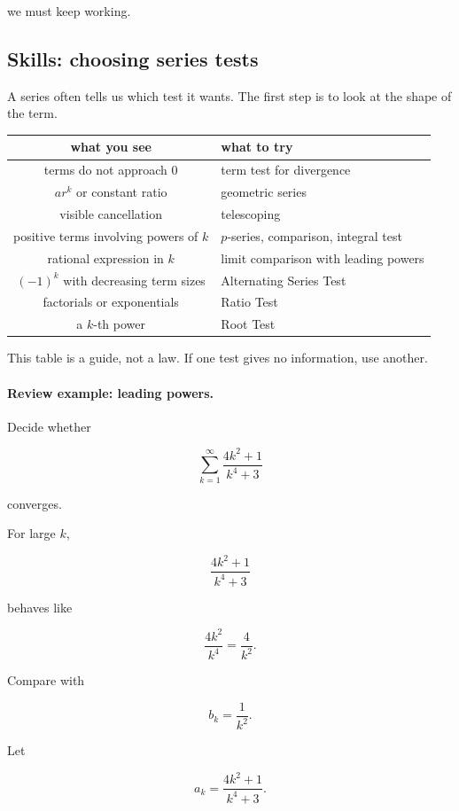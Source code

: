 we must keep working.

\subsection{Skills: choosing series tests}
\label{subsec:skills-choosing-series-tests}

A series often tells us which test it wants.  The first step is to look at the shape of the
term.

\begin{center}
\begin{tabular}{c|l}
\textbf{what you see} & \textbf{what to try} \\ \hline
terms do not approach \(0\) & term test for divergence \\[3pt]
\(ar^k\) or constant ratio & geometric series \\[3pt]
visible cancellation & telescoping \\[3pt]
positive terms involving powers of \(k\) & \(p\)-series, comparison, integral test \\[3pt]
rational expression in \(k\) & limit comparison with leading powers \\[3pt]
\((-1)^k\) with decreasing term sizes & Alternating Series Test \\[3pt]
factorials or exponentials & Ratio Test \\[3pt]
a \(k\)-th power & Root Test
\end{tabular}
\end{center}

This table is a guide, not a law.  If one test gives no information, use another.

\paragraph{Review example: leading powers.}
Decide whether

\[
\sum_{k=1}^{\infty}\frac{4k^2+1}{k^4+3}
\]

converges.

For large \(k\),

\[
\frac{4k^2+1}{k^4+3}
\]

behaves like

\[
\frac{4k^2}{k^4}=\frac4{k^2}.
\]

Compare with

\[
b_k=\frac1{k^2}.
\]

Let

\[
a_k=\frac{4k^2+1}{k^4+3}.
\]


